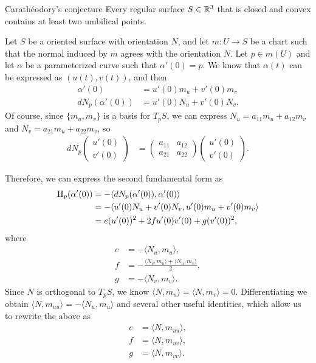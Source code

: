 \begin{conjecture}{Carath\'eodory's conjecture}\proofbreak
    Every regular surface $S \in \mathbb{R}^3$ that is closed and convex contains at least two umbilical points.
\end{conjecture}

Let $S$ be a oriented surface with orientation $N$, and let $m: U \to S$ be a chart such that the normal induced by $m$ agrees with the orientation $N$. Let $p \in m(U)$ and let $\alpha$ be a parameterized curve such that $\alpha'(0) = p$. We know that $\alpha(t)$ can be expressed as $(u(t), v(t))$, and then
\begin{align*}
    \alpha'(0) &= u'(0)m_u + v'(0)m_v \\
    dN_p(\alpha'(0)) &= u'(0)N_u + v'(0)N_v.
\end{align*}
Of course, since $\{m_u, m_v\}$ is a basis for $T_pS$, we can express $N_u = a_{11}m_u + a_{12}m_v$ and $N_v = a_{21}m_u + a_{22}m_v$, so
\begin{align*}
    dN_p\begin{pmatrix}
        u'(0) \\ v'(0)
    \end{pmatrix} &= \begin{pmatrix}
        a_{11} & a_{12} \\
        a_{21} & a_{22}
    \end{pmatrix}\begin{pmatrix}
        u'(0) \\ v'(0)
    \end{pmatrix}.
\end{align*}

Therefore, we can express the second fundamental form as
\begin{align*}
    \operatorname{II}_p(\alpha'(0)) &= -\langle dN_p(\alpha'(0)), \alpha'(0)\rangle \\
    &= -\langle u'(0)N_u + v'(0)N_v, u'(0)m_u + v'(0)m_v \rangle \\
    &= e(u'(0))^2 + 2fu'(0)v'(0) + g(v'(0))^2,
\end{align*}
where
\begin{align*}
    e &= -\langle N_u, m_u \rangle, \\
    f &= -\frac{\langle N_v, m_u\rangle + \langle N_u, m_v\rangle}{2}, \\
    g &= -\langle N_v, m_v \rangle.
\end{align*}
Since $N$ is orthogonal to $T_pS$, we know $\langle N, m_u\rangle = \langle N, m_v\rangle = 0$. Differentiating we obtain $\langle N, m_{uu}\rangle = -\langle N_u, m_u\rangle$ and several other useful identities, which allow us to rewrite the above as
\begin{align*}
    e &= \langle N, m_{uu}\rangle, \\
    f &= \langle N, m_{uv}\rangle, \\
    g &= \langle N, m_{vv}\rangle.
\end{align*}

